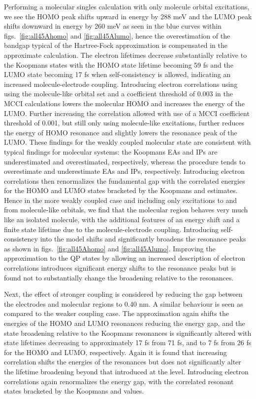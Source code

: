 Performing a molecular singles calculation with only molecule orbital
excitations, we see the HOMO peak shifts upward in energy by 288 meV and
the LUMO peak shifts downward in energy by 260 meV as seen in the blue
curves within figs.~\ref{fig:all45Ahomo} and \ref{fig:all45Alumo}, hence
the overestimation of the bandgap typical of the Hartree-Fock approximation
is compensated in the approximate \dscf calculation.
The electron lifetimes decrease substantially relative to the Koopmans
states with the HOMO state lifetime becoming 59 fs and the LUMO state
becoming 17 fs when self-consistency is allowed, indicating an increased
molecule-electrode coupling. 
Introducing electron correlations using using the molecule-like orbital
set and a coefficient threshold of 0.003 in the MCCI calculations lowers
the molecular HOMO and increases the energy of the LUMO. Further increasing
the correlation allowed with use of a MCCI coefficient threshold of 0.001,
but still only using molecule-like excitations, further reduces the energy
of HOMO resonance and slightly lowers the resonance peak of the LUMO.
These findings for the weakly coupled molecular state are consistent with
typical findings for molecular systems: the Koopmans EAs and IPs are 
underestimated and overestimated, respectively, whereas the \dscf
procedure tends to overestimate and underestimate EAs and IPs, respectively.
Introducing electron correlations then renormalizes the fundamental gap
with the correlated energies for the HOMO and LUMO states bracketed by
the Koopmans and \dscf estimates.
Hence in the more weakly coupled case and including only excitations to and
from molecule-like orbitals, we find that the molecular region behaves
very much like an isolated molecule, with the additional features of an
energy shift and a finite state lifetime due to the molecule-electrode
coupling.
Introducing self-consistency into the model shifts and significantly
broadens the resonance peaks as shown in figs.~\ref{fig:all45Ahomo} and
\ref{fig:all45Alumo}.
Improving the approximation to the \ac{QP} states by allowing an
increased description of electron correlations introduces significant
energy shifts to the resonance peaks but is found not to substantially
change the broadening relative to the \dscf resonances.

Next, the effect of stronger coupling is considered by reducing the gap
between the electrodes and molecular regions to 0.40 nm.
A similar behaviour is seen as compared to the weaker coupling case. The
\dscf approximation again shifts the energies of the HOMO and LUMO
resonances reducing the energy gap, and the state broadening relative to
the Koopmans resonances is significantly altered with state lifetimes
decreasing to approximately 17 fs from 71 fs, and to 7 fs from 26 fs for
the HOMO and LUMO, respectively.
Again it is found that increasing correlation shifts the energies of the
resonances but does not significantly alter the lifetime broadening beyond
that introduced at the \dscf level. Introducing electron correlations
again renormalizes the energy gap, with the correlated resonant states
bracketed by the Koopmans and \dscf values.

